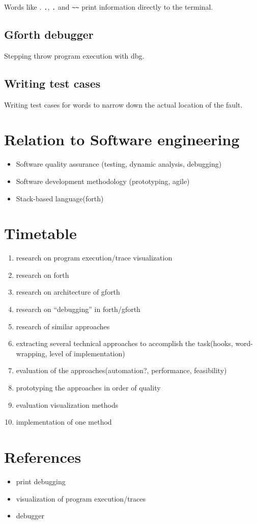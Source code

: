 Words like \emph{.} \texttt{.}, \texttt{.\textquotedbl} and \texttt{\textasciitilde\textasciitilde} print information directly to the terminal.

\subsection{Gforth debugger}

Stepping throw program execution with dbg.

\subsection{Writing test cases}

Writing test cases for words to narrow down the actual location of the fault.

\section{Relation to Software engineering}

\begin{itemize}
	\item Software quality assurance (testing, dynamic analysis, debugging)
	\item Software development methodology (prototyping, agile)
	\item Stack-based language(forth)
\end{itemize}

\section{Timetable}

\begin{enumerate}
  \item research on program execution/trace visualization
	\item research on forth
  \item research on architecture of gforth
  \item research on ``debugging'' in forth/gforth
  \item research of similar approaches
  \item extracting several technical approaches to accomplish the task(hooks, word-wrapping, level of implementation)
  \item evaluation of the approaches(automation?, performance, feasibility)
  \item prototyping the approaches in order of quality
  \item evaluation visualization methods
  \item implementation of one method
\end{enumerate}


\section{References}

\begin{itemize}
	\item print debugging
	\item visualization of program execution/traces
	\item debugger
\end{itemize}